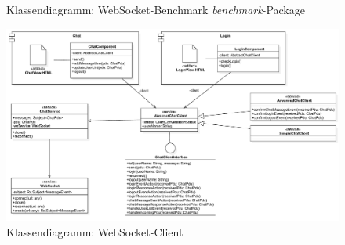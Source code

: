\documentclass[11pt,a4paper,titlepage]{scrartcl}
\numberwithin{equation}{section}
\begin{document}
\begin{landscape}
\begin{figure}[ht]
\begin{center}
		\caption[]{Klassendiagramm: WebSocket-Benchmark \textit{benchmark}-Package}
		\label{fig:kdbench}
	\end{center}
\end{figure}
\begin{figure}[ht] 
	\begin{center}
		\includegraphics[scale=0.7]{img/ClientNew.pdf}
		\caption[]{Klassendiagramm: WebSocket-Client}
		\label{fig:kdClient}
	\end{center}
\end{figure}
\end{landscape}
\end{document}
